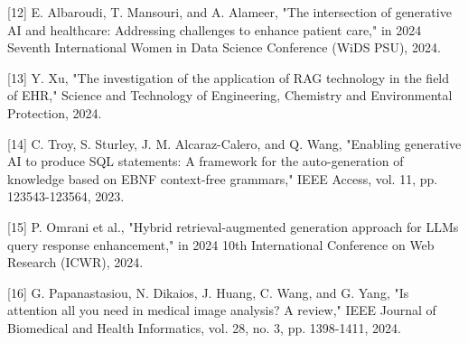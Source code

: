 [12] E. Albaroudi, T. Mansouri, and A. Alameer, "The intersection of generative AI and healthcare: Addressing challenges to enhance patient care," in 2024 Seventh International Women in Data Science Conference (WiDS PSU), 2024.

[13] Y. Xu, "The investigation of the application of RAG technology in the field of EHR," Science and Technology of Engineering, Chemistry and Environmental Protection, 2024.

[14] C. Troy, S. Sturley, J. M. Alcaraz-Calero, and Q. Wang, "Enabling generative AI to produce SQL statements: A framework for the auto-generation of knowledge based on EBNF context-free grammars," IEEE Access, vol. 11, pp. 123543-123564, 2023.

[15] P. Omrani et al., "Hybrid retrieval-augmented generation approach for LLMs query response enhancement," in 2024 10th International Conference on Web Research (ICWR), 2024.

[16] G. Papanastasiou, N. Dikaios, J. Huang, C. Wang, and G. Yang, "Is attention all you need in medical image analysis? A review," IEEE Journal of Biomedical and Health Informatics, vol. 28, no. 3, pp. 1398-1411, 2024. 